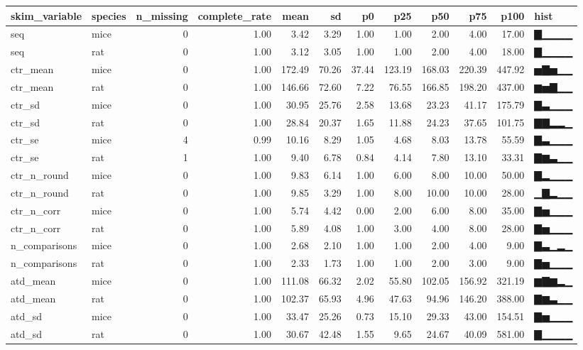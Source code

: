 \documentclass[
]{article}
\begin{document}
\begin{longtable}[]{@{}llrrrrrrrrrl@{}}
\toprule
skim\_variable & species & n\_missing & complete\_rate & mean & sd & p0
& p25 & p50 & p75 & p100 & hist \\
\midrule
\endhead
seq & mice & 0 & 1.00 & 3.42 & 3.29 & 1.00 & 1.00 & 2.00 & 4.00 & 17.00
& ▇▁▁▁▁ \\
seq & rat & 0 & 1.00 & 3.12 & 3.05 & 1.00 & 1.00 & 2.00 & 4.00 & 18.00 &
▇▁▁▁▁ \\
ctr\_mean & mice & 0 & 1.00 & 172.49 & 70.26 & 37.44 & 123.19 & 168.03 &
220.39 & 447.92 & ▅▇▅▁▁ \\
ctr\_mean & rat & 0 & 1.00 & 146.66 & 72.60 & 7.22 & 76.55 & 166.85 &
198.20 & 437.00 & ▆▅▇▁▁ \\
ctr\_sd & mice & 0 & 1.00 & 30.95 & 25.76 & 2.58 & 13.68 & 23.23 & 41.17
& 175.79 & ▇▃▁▁▁ \\
ctr\_sd & rat & 0 & 1.00 & 28.84 & 20.37 & 1.65 & 11.88 & 24.23 & 37.65
& 101.75 & ▇▇▂▂▁ \\
ctr\_se & mice & 4 & 0.99 & 10.16 & 8.29 & 1.05 & 4.68 & 8.03 & 13.78 &
55.59 & ▇▃▁▁▁ \\
ctr\_se & rat & 1 & 1.00 & 9.40 & 6.78 & 0.84 & 4.14 & 7.80 & 13.10 &
33.31 & ▇▆▃▁▁ \\
ctr\_n\_round & mice & 0 & 1.00 & 9.83 & 6.14 & 1.00 & 6.00 & 8.00 &
10.00 & 50.00 & ▇▂▁▁▁ \\
ctr\_n\_round & rat & 0 & 1.00 & 9.85 & 3.29 & 1.00 & 8.00 & 10.00 &
10.00 & 28.00 & ▁▇▂▁▁ \\
ctr\_n\_corr & mice & 0 & 1.00 & 5.74 & 4.42 & 0.00 & 2.00 & 6.00 & 8.00
& 35.00 & ▇▅▁▁▁ \\
ctr\_n\_corr & rat & 0 & 1.00 & 5.89 & 4.08 & 1.00 & 3.00 & 4.00 & 8.00
& 28.00 & ▇▅▁▁▁ \\
n\_comparisons & mice & 0 & 1.00 & 2.68 & 2.10 & 1.00 & 1.00 & 2.00 &
4.00 & 9.00 & ▇▃▁▂▁ \\
n\_comparisons & rat & 0 & 1.00 & 2.33 & 1.73 & 1.00 & 1.00 & 2.00 &
3.00 & 9.00 & ▇▅▁▁▁ \\
atd\_mean & mice & 0 & 1.00 & 111.08 & 66.32 & 2.02 & 55.80 & 102.05 &
156.92 & 321.19 & ▆▇▆▂▁ \\
atd\_mean & rat & 0 & 1.00 & 102.37 & 65.93 & 4.96 & 47.63 & 94.96 &
146.20 & 388.00 & ▇▆▃▁▁ \\
atd\_sd & mice & 0 & 1.00 & 33.47 & 25.26 & 0.73 & 15.10 & 29.33 & 43.00
& 154.51 & ▇▅▁▁▁ \\
atd\_sd & rat & 0 & 1.00 & 30.67 & 42.48 & 1.55 & 9.65 & 24.67 & 40.09 &
581.00 & ▇▁▁▁▁ \\

\end{longtable}
\end{document}
